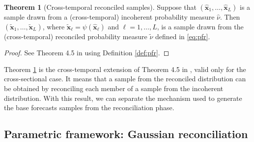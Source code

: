 \documentclass[a4paper,11pt]{article}
\newcommand{\xvet}{\bm{x}}
\theoremstyle{definition}
\newtheorem{theorem}{Theorem}[section]
\begin{document}
\begin{theorem}[Cross-temporal reconciled samples] \label{thm:rs}
	Suppose that $(\widehat{\xvet}_1, \dots, \widehat{\xvet}_L)$ is a sample drawn from a (cross-temporal) incoherent probability measure $\widehat{\nu}$. Then $(\widetilde{\xvet}_1, \dots, \widetilde{\xvet}_L)$, where $\widetilde{\xvet}_\ell=\psi(\widehat{\xvet}_\ell)$ and $\ell= 1, \dots, L$, is a sample drawn from the (cross-temporal) reconciled probability measure $\widetilde{\nu}$ defined in \eqref{eq:pfr}.
\end{theorem}
\begin{proof}
	See Theorem 4.5 in \cite{panagiotelis2023} using Definition \ref{def:pfr}.
\end{proof}
Theorem \ref{thm:rs} is the cross-temporal extension of Theorem 4.5 in \cite{panagiotelis2023}, valid only for the cross-sectional case. It means that a sample from the reconciled distribution can be obtained by reconciling each member of a sample from the incoherent distribution. With this result, we can separate the mechanism used to generate the base forecasts samples from the reconciliation phase.


\subsection{Parametric framework: Gaussian reconciliation}\label{ssec:prob_pf}
\end{document}
